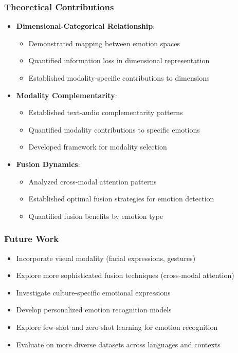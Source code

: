\begin{frame}
\frametitle{Theoretical Contributions}
\begin{itemize}
    \item \textbf{Dimensional-Categorical Relationship}:
    \begin{itemize}
        \item Demonstrated mapping between emotion spaces
        \item Quantified information loss in dimensional representation
        \item Established modality-specific contributions to dimensions
    \end{itemize}
    \item \textbf{Modality Complementarity}:
    \begin{itemize}
        \item Established text-audio complementarity patterns
        \item Quantified modality contributions to specific emotions
        \item Developed framework for modality selection
    \end{itemize}
    \item \textbf{Fusion Dynamics}:
    \begin{itemize}
        \item Analyzed cross-modal attention patterns
        \item Established optimal fusion strategies for emotion detection
        \item Quantified fusion benefits by emotion type
    \end{itemize}
\end{itemize}
\end{frame}

\begin{frame}
\frametitle{Future Work}
\begin{itemize}
    \item Incorporate visual modality (facial expressions, gestures)
    \item Explore more sophisticated fusion techniques (cross-modal attention)
    \item Investigate culture-specific emotional expressions
    \item Develop personalized emotion recognition models
    \item Explore few-shot and zero-shot learning for emotion recognition
    \item Evaluate on more diverse datasets across languages and contexts
\end{itemize}
\end{frame}

